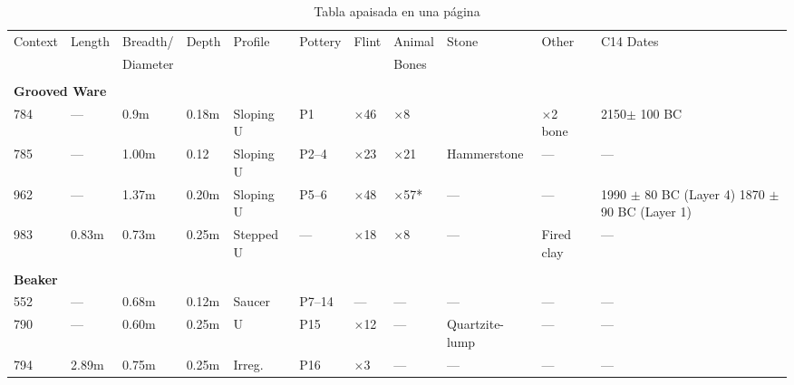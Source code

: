 \documentclass[ 		%
	11pt,				%
	a4paper,			%
	twoside,			%
	openright,			%
	final       		%
]{book}
\begin{document}
\begin{table}
	\centering
	\caption[Ejemplo de tabla apaisada]{Tabla apaisada en una página}\label{tab:apaisada}
	\begin{tabular}{llllllllp{1in}lp{1in}}
		\toprule
		Context   &Length   &Breadth/   &Depth   &Profile   &Pottery   &Flint   &Animal   &Stone   &Other    &C14 Dates \\
		&         &Diameter   &        &          &          &        & 
		Bones&&&\\
		\midrule
		&&&&&&&&&&\\
		\multicolumn{10}{l}{\bf Grooved Ware}&\\
		784       &---        &0.9m       &0.18m   &Sloping U &P1       &$\times$46  &  $\times$8      &&       $\times$2 bone&  2150$\pm$ 100 BC\\
		785       &---        &1.00m      &0.12    &Sloping U &P2--4    &$\times$23  &  $\times$21     & Hammerstone &---&---\\
		962       &---        &1.37m      &0.20m   &Sloping U &P5--6    &$\times$48  &  $\times$57*    & ---&     ---&1990 $\pm$ 80 BC (Layer 4) 1870 $\pm$90 BC (Layer 1)\\
		983       &0.83m      &0.73m      &0.25m   &Stepped U &---      &$\times$18  &  $\times$8      & ---& Fired clay&---\\
		&&&&&&&&&&\\
		\multicolumn{10}{l}{\bf Beaker}&\\
		552       &---        &0.68m      &0.12m   &Saucer    &P7--14   &---           & ---       & ---       &---        &---\\
		790       &---        &0.60m      &0.25m   &U         &P15      &$\times$12    & ---       & Quartzite-lump&---    &---\\
		794       &2.89m      &0.75m      &0.25m   &Irreg.    &P16      &$\times$3     & ---       & ---       &---        &---\\
		\bottomrule
	\end{tabular}
\end{table}
\end{document}

